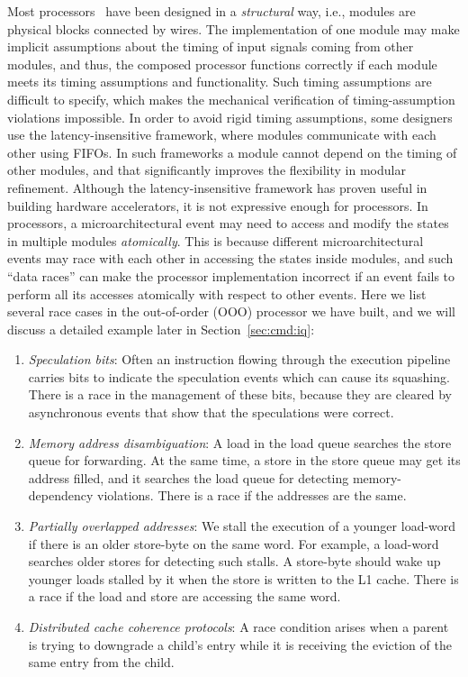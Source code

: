 \documentclass[conference]{IEEEtran}
\begin{document}
Most processors~\cite{rocketchip,boom,fabscalar,pulp} have been designed in a \emph{structural} way, i.e., modules are physical blocks connected by wires.
The implementation of one module may make implicit assumptions about the timing of input signals coming from other modules, and thus, the composed processor functions correctly if each module meets its timing assumptions and functionality.
Such timing assumptions are difficult to specify, which makes the mechanical verification of timing-assumption violations impossible.
In order to avoid rigid timing assumptions, some designers use the latency-insensitive framework, where modules communicate with each other using FIFOs.
In such frameworks a module cannot depend on the timing of other modules, and that significantly improves the flexibility in modular refinement.
Although the latency-insensitive framework has proven useful in building hardware accelerators, it is not expressive enough for processors. 
In processors, a microarchitectural event may need to access and modify the states in multiple modules \emph{atomically}. 
This is because different microarchitectural events may race with each other in accessing the states inside modules, and such ``data races'' can make the processor implementation incorrect if an event fails to perform all its accesses atomically with respect to other events.
Here we list several race cases in the out-of-order (OOO) processor we have built, and we will discuss a detailed example later in Section~\ref{sec:cmd:iq}:
\begin{enumerate}
    \item \emph{Speculation bits}:
    Often an instruction flowing through the execution pipeline carries bits to indicate the speculation events which can cause its squashing.
    There is a race in the management of these bits, because they are cleared by asynchronous events that show that the speculations were correct.
    
    \item \emph{Memory address disambiguation}:
    A load in the load queue searches the store queue for forwarding.
    At the same time, a store in the store queue may get its address filled, and it searches the load queue for detecting memory-dependency violations. 
    There is a race if the addresses are the same.
    
    \item \emph{Partially overlapped addresses}:
    We stall the execution of a younger load-word if there is an older store-byte on the same word.
    For example, a load-word searches older stores for detecting such stalls. %
    A store-byte should wake up younger loads stalled by it when the store is written to the L1 cache.
    There is a race if the load and store are accessing the same word.
    
    \item \emph{Distributed cache coherence protocols}:
    A race condition arises when a parent is trying to downgrade a child's entry while it is receiving the eviction of the same entry from the child.
\end{enumerate}
\end{document}
